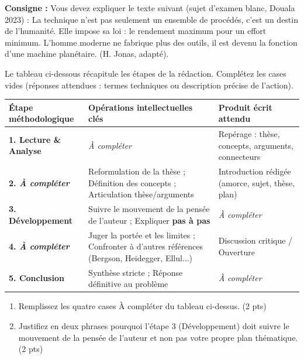 \documentclass[11pt]{article}
\begin{document}
\begin{exercice}
\textbf{Consigne :} Vous devez expliquer le texte suivant (sujet d'examen blanc, Douala 2023) : \og La technique n'est pas seulement un ensemble de procédés, c'est un destin de l'humanité. Elle impose sa loi : le rendement maximum pour un effort minimum. L'homme moderne ne fabrique plus des outils, il est devenu la fonction d'une machine planétaire. \fg (H. Jonas, adapté).

Le tableau ci-dessous récapitule les étapes de la rédaction. Complétez les cases vides (réponses attendues : termes techniques ou description précise de l'action).

\begin{center}
\begin{tabularx}{\linewidth}{|>{\bfseries}l|X|X|}
\hline
\textbf{Étape méthodologique} & \textbf{Opérations intellectuelles clés} & \textbf{Produit écrit attendu} \\
\hline
1. Lecture \& Analyse & \textit{À compléter} & Repérage : thèse, concepts, arguments, connecteurs \\
\hline
2. \textit{À compléter} & Reformulation de la thèse ; Définition des concepts ; Articulation thèse/arguments & Introduction rédigée (amorce, sujet, thèse, plan) \\
\hline
3. Développement & Suivre le mouvement de la pensée de l'auteur ; Expliquer \textbf{pas à pas} & \textit{À compléter} \\
\hline
4. \textit{À compléter} & Juger la portée et les limites ; Confronter à d'autres références (Bergson, Heidegger, Ellul...) & Discussion critique / Ouverture \\
\hline
5. Conclusion & Synthèse stricte ; Réponse définitive au problème & \textit{À compléter} \\
\hline
\end{tabularx}
\end{center}

\begin{enumerate}
    \item Remplissez les quatre cases \og À compléter \fg du tableau ci-dessus. (2 pts)
    \item Justifiez en deux phrases pourquoi l'étape 3 (Développement) doit \og suivre le mouvement de la pensée de l'auteur \fg et non pas votre propre plan thématique. (2 pts)
\end{enumerate}
\end{exercice}
\end{document}
